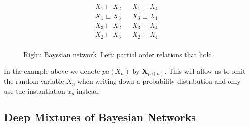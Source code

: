 \documentclass[letterpaper]{article} %
\newcommand{\Xvars}{\ensuremath{\mathbf{X}}}
\newcommand{\Xvar}{\ensuremath{X}}
\newcommand{\xvar}{\ensuremath{x}}
\newcommand{\parents}{\ensuremath{{pa}}}
\begin{document}
\begin{figure}


    \begin{minipage}{0.50\linewidth}
        \begin{align*}
            X_1 \sqsubset X_2 &  & X_1 \sqsubset X_4 \\
            X_1 \sqsubset X_3 &  & X_3 \sqsubset X_1 \\
            X_3 \sqsubset X_2 &  & X_3 \sqsubset X_4 \\
            X_2 \sqsubset X_3 &  & X_2 \sqsubset X_4 \\
        \end{align*}


    \end{minipage}%
    \begin{minipage}{0.49\linewidth}
    \end{minipage}
    \caption{Right: Bayesian network. Left: partial order relations that hold.}
    \label{fig:bn}
\end{figure}


In the example above we denote $\parents(X_n)$ by $\Xvars_{\parents(n)}$. This will allow us to omit the random variable $\Xvar_n$ when writing down a probability distribution and only use the instantiation $\xvar_n$ instead.






\subsection{Deep Mixtures of Bayesian Networks}
\label{sec:dmbn}
\end{document}
